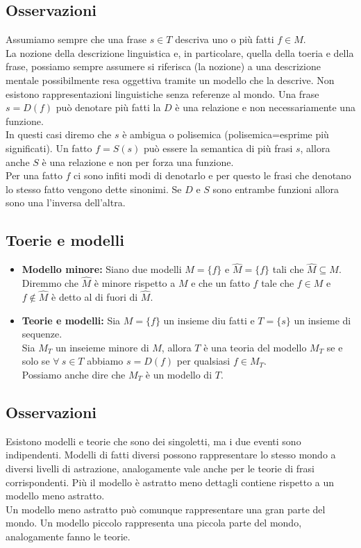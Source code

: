 \documentclass{book}
\newcommand{\spazio}{\vspace{1em} \newline}
\begin{document}
    \subsection{Osservazioni}
    Assumiamo sempre che una frase $s \in T$ descriva uno o più fatti $f \in M$.\\
    La nozione della descrizione linguistica e, in particolare, quella della toeria e della frase, possiamo sempre assumere si riferisca (la nozione) a una descrizione mentale possibilmente resa oggettiva tramite un modello che la descrive.
    \spazio
    Non esistono rappresentazioni linguistiche senza referenze al mondo.
    \spazio
    Una frase $s=D(f)$ può denotare più fatti la $D$ è una relazione e non necessariamente una funzione.\\
    In questi casi diremo che $s$ è ambigua o polisemica (polisemica=esprime più significati).
    \spazio
    Un fatto $f=S(s)$ può essere la semantica di più frasi $s$, allora anche $S$ è una relazione e non per forza una funzione.\\
    Per una fatto $f$ ci sono infiti modi di denotarlo e per questo le frasi che denotano lo stesso fatto vengono dette sinonimi.
    \spazio
    Se $D$ e $S$ sono entrambe funzioni allora sono una l'inversa dell'altra.

    \subsection{Toerie e modelli}
    \begin{itemize}
        \item \textbf{Modello minore:} Siano due modelli $M=\{f\}$ e $\widehat{M}=\{f\}$ tali che $\widehat{M}\subseteq M$.\\
            Diremmo che $\widehat{M}$ è minore rispetto a $M$ e che un fatto $f$ tale che $f \in M$ e $f \notin \widehat{M}$ è detto al di fuori di $\widehat{M}$.
        \item \textbf{Teorie e modelli:} Sia $M=\{f\}$ un insieme diu fatti e $T=\{s\}$ un insieme di sequenze.\\
            Sia $M_T$ un inseieme minore di $M$, allora $T$ è una teoria del modello $M_T$ se e solo se $\forall\ s\in T$ abbiamo $s=D(f) $ per qualsiasi $f \in M_T$.\\
            Possiamo anche dire che $M_T$ è un modello di $T$. 
    \end{itemize}

    \subsection{Osservazioni}
    Esistono modelli e teorie che sono dei singoletti, ma i due eventi sono indipendenti.
    \spazio
    Modelli di fatti diversi possono rappresentare lo stesso mondo a diversi livelli di astrazione, analogamente vale anche per le teorie di frasi corrispondenti.
    \spazio
    Più il modello è astratto meno dettagli contiene rispetto a un modello meno astratto.\\
    Un modello meno astratto può comunque rappresentare una gran parte del mondo.
    \spazio
    Un modello piccolo rappresenta una piccola parte del mondo, analogamente fanno le teorie.
\end{document}
